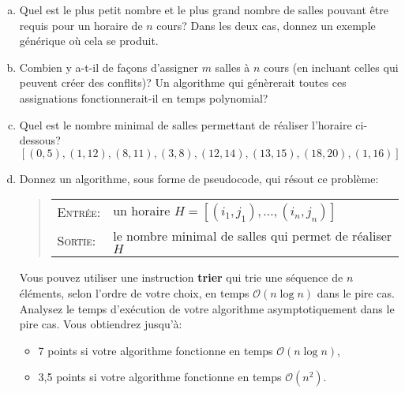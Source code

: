 \documentclass{article}
\renewcommand{\O}{\mathcal{O}}                   %
\begin{document}
\begin{question}
  \begin{enumerate}[(a)]
  \setlength\itemsep{15pt}

  \item Quel est  le plus petit nombre et le
    plus grand nombre de salles pouvant être requis pour un horaire de
    $n$ cours? Dans les deux cas, donnez un exemple générique où cela
    se produit.

  \item Combien  y a-t-il de façons
    d'assigner $m$ salles à $n$ cours (en incluant celles qui peuvent
    créer des conflits)? Un algorithme qui génèrerait toutes ces
    assignations fonctionnerait-il en temps polynomial?

  \item Quel est  le nombre minimal de salles
    permettant de réaliser l'horaire ci-dessous? \[[(0, 5), (1, 12),
      (8, 11), (3, 8), (12, 14), (13, 15), (18, 20), (1, 16)]\]

  \item Donnez un  algorithme, sous forme de
    pseudocode, qui résout ce problème:
    \begin{quote}
      \smallskip
      \begin{tabular}{ll}
        \textsc{Entrée}: & un horaire $H = [(i_1, j_1), \ldots, (i_n,
          j_n)]$ \\[2pt]
        
        \textsc{Sortie}: & le nombre minimal de salles qui permet de
        réaliser $H$
      \end{tabular}
      \smallskip
    \end{quote}

    Vous pouvez utiliser une instruction \textbf{trier} qui trie une
    séquence de $n$ éléments, selon l'ordre de votre choix, en temps
    $\O(n \log n)$ dans le pire cas. Analysez le temps d'exécution de
    votre algorithme asymptotiquement dans le pire cas. Vous
    obtiendrez jusqu'à:\medskip
    \begin{itemize}
    \setlength\itemsep{8pt}
      
    \item 7 points si votre algorithme fonctionne en temps
      $\O(n \log n)$,
      
    \item 3{,}5 points si votre algorithme fonctionne en temps $\O(n^2)$.
    \end{itemize}
  \end{enumerate}
\end{question}
\end{document}
